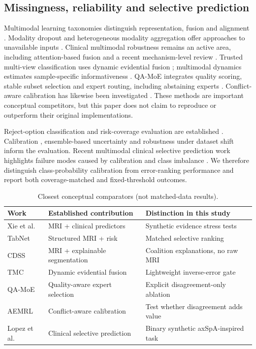 \documentclass[conference]{IEEEtran}
\begin{document}
\subsection{Missingness, reliability and selective prediction}
Multimodal learning taxonomies distinguish representation, fusion and alignment \cite{bal}. Modality dropout and heterogeneous modality aggregation offer approaches to unavailable inputs \cite{moddrop,hemis}. Clinical multimodal robustness remains an active area, including attention-based fusion \cite{attention} and a recent mechanism-level review \cite{missingreview}. Trusted multi-view classification uses dynamic evidential fusion \cite{tmc}; multimodal dynamics estimates sample-specific informativeness \cite{dynamics}. QA-MoE integrates quality scoring, stable subset selection and expert routing, including abstaining experts \cite{qamoe}. Conflict-aware calibration has likewise been investigated \cite{aemrl}. These methods are important conceptual competitors, but this paper does not claim to reproduce or outperform their original implementations.

Reject-option classification and risk-coverage evaluation are established \cite{selective}. Calibration \cite{guo}, ensemble-based uncertainty \cite{ensembles} and robustness under dataset shift \cite{ovadia} inform the evaluation. Recent multimodal clinical selective prediction work highlights failure modes caused by calibration and class imbalance \cite{lopez}. We therefore distinguish class-probability calibration from error-ranking performance and report both coverage-matched and fixed-threshold outcomes.
\begin{table}[t]
\caption{Closest conceptual comparators (not matched-data results).}
\label{tab:related}
\centering\footnotesize
\begin{tabular}{@{}p{}p{}p{}@{}}\toprule
Work & Established contribution & Distinction in this study\\\midrule
Xie et al. \cite{xie} & MRI + clinical predictors & Synthetic evidence stress tests\\
TabNet \cite{tabnet} & Structured MRI + risk & Matched selective ranking\\
CDSS \cite{cdss} & MRI + explainable segmentation & Coalition explanations, no raw MRI\\
TMC \cite{tmc} & Dynamic evidential fusion & Lightweight inverse-error gate\\
QA-MoE \cite{qamoe} & Quality-aware expert selection & Explicit disagreement-only ablation\\
AEMRL \cite{aemrl} & Conflict-aware calibration & Test whether disagreement adds value\\
Lopez et al. \cite{lopez} & Clinical selective prediction & Binary synthetic axSpA-inspired task\\\bottomrule
\end{tabular}
\end{table}
\end{document}
